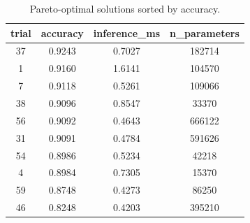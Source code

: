 \begin{table}
\caption{Pareto-optimal solutions sorted by accuracy.}
\label{tab:pareto}
\begin{tabular}{cccc}
\toprule
trial & accuracy & inference_ms & n_parameters \\
\midrule
37 & 0.9243 & 0.7027 & 182714 \\
1 & 0.9160 & 1.6141 & 104570 \\
7 & 0.9118 & 0.5261 & 109066 \\
38 & 0.9096 & 0.8547 & 33370 \\
56 & 0.9092 & 0.4643 & 666122 \\
31 & 0.9091 & 0.4784 & 591626 \\
54 & 0.8986 & 0.5234 & 42218 \\
4 & 0.8984 & 0.7305 & 15370 \\
59 & 0.8748 & 0.4273 & 86250 \\
46 & 0.8248 & 0.4203 & 395210 \\
\bottomrule
\end{tabular}
\end{table}
